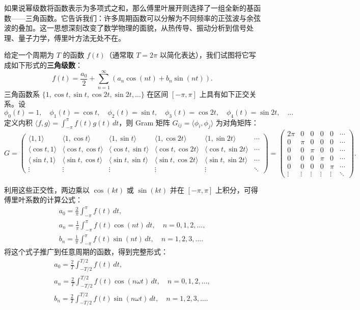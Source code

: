 \documentclass[UTF8]{ctexbook}
\begin{document}
如果说幂级数将函数表示为多项式之和，那么傅里叶展开则选择了一组全新的基函数——三角函数。它告诉我们：许多周期函数可以分解为不同频率的正弦波与余弦波的叠加。这一思想深刻改变了数学物理的面貌，从热传导、振动分析到信号处理、量子力学，傅里叶方法无处不在。

给定一个周期为 $T$ 的函数 $f(t)$（通常取 $T = 2\pi$ 以简化表达），我们试图将它写成如下形式的\textbf{三角级数}：
\[
f(t) = \frac{a_0}{2} + \sum_{n=1}^{\infty} \left( a_n \cos(nt) + b_n \sin(nt) \right).
\]
三角函数系 $\{1, \cos t, \sin t, \cos 2t, \sin 2t, \dots\}$ 在区间 $[-\pi, \pi]$ 上具有如下正交关系。设
\[
\phi_0(t)=1,\quad \phi_1(t)=\cos t,\quad \phi_2(t)=\sin t,\quad \phi_3(t)=\cos 2t,\quad \phi_4(t)=\sin 2t,\quad \dots
\]
定义内积 $\langle f,g\rangle = \int_{-\pi}^{\pi} f(t)g(t)\,dt$，则 Gram 矩阵 $G_{ij}=\langle \phi_i,\phi_j\rangle$ 为对角矩阵：
\[
G = \begin{pmatrix}
\langle 1,1\rangle & \langle 1,\cos t\rangle & \langle 1,\sin t\rangle & \langle 1,\cos 2t\rangle & \langle 1,\sin 2t\rangle & \cdots \\[4pt]
\langle \cos t,1\rangle & \langle \cos t,\cos t\rangle & \langle \cos t,\sin t\rangle & \langle \cos t,\cos 2t\rangle & \langle \cos t,\sin 2t\rangle & \cdots \\[4pt]
\langle \sin t,1\rangle & \langle \sin t,\cos t\rangle & \langle \sin t,\sin t\rangle & \langle \sin t,\cos 2t\rangle & \langle \sin t,\sin 2t\rangle & \cdots \\[4pt]
\vdots & \vdots & \vdots & \vdots & \vdots & \ddots
\end{pmatrix}
=
\begin{pmatrix}
2\pi & 0 & 0 & 0 & 0 & \cdots \\
0 & \pi & 0 & 0 & 0 & \cdots \\
0 & 0 & \pi & 0 & 0 & \cdots \\
0 & 0 & 0 & \pi & 0 & \cdots \\
0 & 0 & 0 & 0 & \pi & \cdots \\
\vdots & \vdots & \vdots & \vdots & \vdots & \ddots
\end{pmatrix}.
\]

利用这些正交性，两边乘以 $\cos(kt)$ 或 $\sin(kt)$ 并在 $[-\pi,\pi]$ 上积分，可得傅里叶系数的计算公式：
\[
\begin{gathered}
a_0 = \frac{2}{\pi} \int_{-\pi}^{\pi} f(t) \, dt, \\
a_n = \frac{1}{\pi} \int_{-\pi}^{\pi} f(t) \cos(nt) \, dt, \quad n = 0,1,2,\dots, \\
b_n = \frac{1}{\pi} \int_{-\pi}^{\pi} f(t) \sin(nt) \, dt, \quad n = 1,2,3,\dots.
\end{gathered}
\]
将这个式子推广到任意周期的函数，得到完整形式：
\[
\boxed{
\begin{gathered}
a_0 = \frac{2}{T} \int_{-T/2}^{T/2} f(t) \, dt, \\
a_n = \frac{2}{T} \int_{-T/2}^{T/2} f(t) \cos(n \omega t) \, dt, \quad n = 0,1,2,\dots, \\
b_n = \frac{2}{T} \int_{-T/2}^{T/2} f(t) \sin(n \omega t) \, dt, \quad n = 1,2,3,\dots.
\end{gathered}
}
\]
\end{document}

